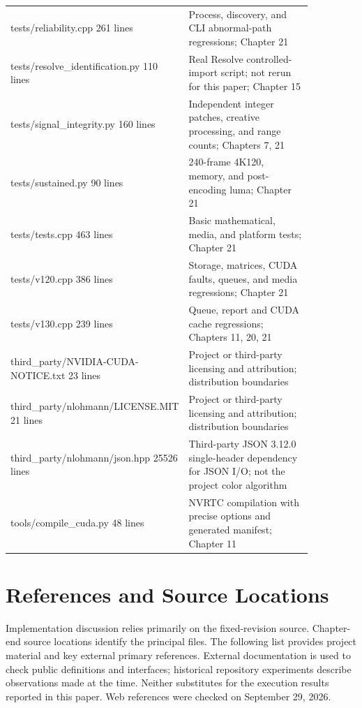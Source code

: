 \documentclass[11pt,a4paper,openany]{book}
\begin{document}
\begin{longtable}{p{0.43\linewidth}p{0.43\linewidth}}
tests/reliability.cpp
261 lines & Process, discovery, and CLI abnormal-path regressions; Chapter 21\\
tests/resolve\_identification.py
110 lines & Real Resolve controlled-import script; not rerun for this paper; Chapter 15\\
tests/signal\_integrity.py
160 lines & Independent integer patches, creative processing, and range counts; Chapters 7, 21\\
tests/sustained.py
90 lines & 240-frame 4K120, memory, and post-encoding luma; Chapter 21\\
tests/tests.cpp
463 lines & Basic mathematical, media, and platform tests; Chapter 21\\
tests/v120.cpp
386 lines & Storage, matrices, CUDA faults, queues, and media regressions; Chapter 21\\
tests/v130.cpp
239 lines & Queue, report and CUDA cache regressions; Chapters 11, 20, 21\\
third\_party/NVIDIA-CUDA-NOTICE.txt
23 lines & Project or third-party licensing and attribution; distribution boundaries\\
third\_party/nlohmann/LICENSE.MIT
21 lines & Project or third-party licensing and attribution; distribution boundaries\\
third\_party/nlohmann/json.hpp
25526 lines & Third-party JSON 3.12.0 single-header dependency for JSON I/O; not the project color algorithm\\
tools/compile\_cuda.py
48 lines & NVRTC compilation with precise options and generated manifest; Chapter 11\\
\bottomrule
\end{longtable}

\chapter*{References and Source Locations}
Implementation discussion relies primarily on the fixed-revision source. Chapter-end source locations identify the principal files. The following list provides project material and key external primary references. External documentation is used to check public definitions and interfaces; historical repository experiments describe observations made at the time. Neither substitutes for the execution results reported in this paper. Web references were checked on September 29, 2026.
\end{document}
